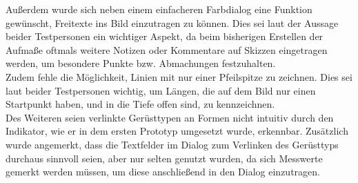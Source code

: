 Außerdem wurde sich neben einem einfacheren Farbdialog eine Funktion gewünscht, Freitexte ins Bild einzutragen zu können. 
Dies sei laut der Aussage beider Testpersonen ein wichtiger Aspekt, da beim bisherigen Erstellen der Aufmaße oftmals weitere Notizen oder Kommentare auf Skizzen eingetragen werden, um besondere Punkte bzw. Abmachungen festzuhalten. \\

Zudem fehle die Möglichkeit, Linien mit nur einer Pfeilspitze zu zeichnen.
Dies sei laut beider Testpersonen wichtig, um Längen, die auf dem Bild nur einen Startpunkt haben, und in die Tiefe offen sind, zu kennzeichnen. \\

Des Weiteren seien verlinkte Gerüsttypen an Formen nicht intuitiv durch den Indikator, wie er in dem ersten Prototyp umgesetzt wurde, erkennbar.
Zusätzlich wurde angemerkt, dass die Textfelder im Dialog zum Verlinken des Gerüsttyps durchaus sinnvoll seien, aber nur selten genutzt wurden, da sich Messwerte gemerkt werden müssen, um diese anschließend in den Dialog einzutragen. \\
